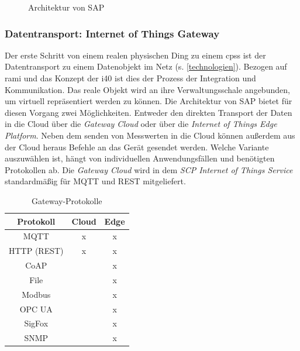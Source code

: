 \begin{figure}[ht!]
  \centering
  \noindent{}
  \caption[Architektur von SAP]{Architektur von SAP \citep{Ganz2019}}
  \label{saparch}
\end{figure}

\newpage
\subsubsection{Datentransport: Internet of Things Gateway}

  Der erste Schritt von einem realen physischen Ding zu einem \ac{cpss} ist der Datentransport zu einem Datenobjekt im Netz (s. \ref{technologien}). Bezogen auf \ac{rami} und das Konzept der \acf{i40} ist dies der Prozess der Integration und Kommunikation. Das reale Objekt wird an ihre Verwaltungsschale angebunden, um virtuell repräsentiert werden zu können. Die Architektur von SAP bietet für diesen Vorgang zwei Möglichkeiten. Entweder den direkten Transport der Daten in die Cloud über die \textit{Gateway Cloud} oder über die \textit{Internet of Things Edge Platform}. Neben dem senden von Messwerten in die Cloud können außerdem aus der Cloud heraus Befehle an das Gerät gesendet werden. Welche Variante auszuwählen ist, hängt von individuellen Anwendungsfällen und benötigten Protokollen ab. Die \textit{Gateway Cloud} wird in dem \textit{SCP Internet of Things Service} standardmäßig für MQTT und REST mitgeliefert.
  \begin{table}
    \caption{Gateway-Protokolle}\label{gateway}
    \begin{tabular}{ccc}\\\toprule
    Protokoll & Cloud & Edge \\\midrule
    MQTT &x & x\\  \midrule
    HTTP (REST) & x & x\\  \midrule
    CoAP& & x\\  \midrule
    File &  & x\\  \midrule
    Modbus & & x\\  \midrule
    OPC UA & & x\\  \midrule
    SigFox & & x\\  \midrule
    SNMP & & x\\  \bottomrule
    \end{tabular}
    \label{protocol}
  \end{table}
  \newline
